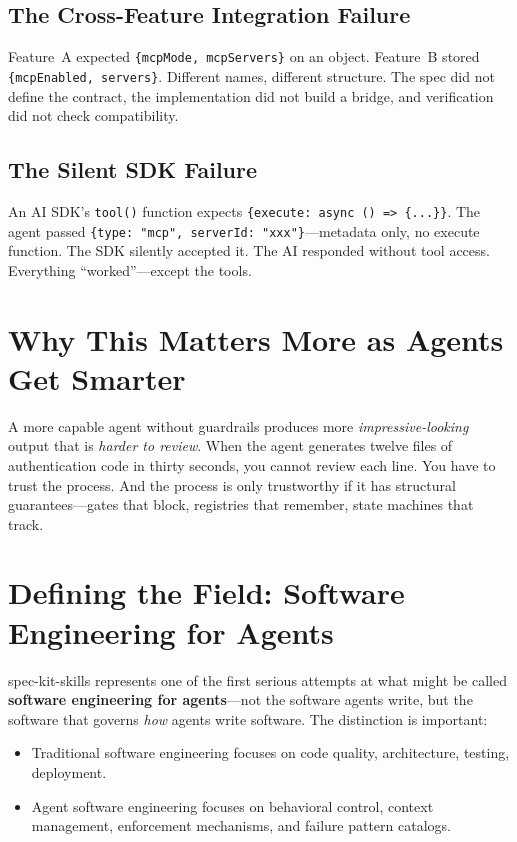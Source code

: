\documentclass[11pt,a4paper,openright,twoside]{report}
\begin{document}
\subsection{The Cross-Feature Integration Failure}

Feature~A expected \texttt{\{mcpMode, mcpServers\}} on an object. Feature~B stored \texttt{\{mcpEnabled, servers\}}. Different names, different structure. The spec did not define the contract, the implementation did not build a bridge, and verification did not check compatibility.

\subsection{The Silent SDK Failure}

An AI SDK's \texttt{tool()} function expects \texttt{\{execute: async () => \{...\}\}}. The agent passed \texttt{\{type: "mcp", serverId: "xxx"\}}---metadata only, no execute function. The SDK silently accepted it. The AI responded without tool access. Everything ``worked''---except the tools.

\section{Why This Matters More as Agents Get Smarter}

A more capable agent without guardrails produces more \emph{impressive-looking} output that is \emph{harder to review}. When the agent generates twelve files of authentication code in thirty seconds, you cannot review each line. You have to trust the process. And the process is only trustworthy if it has structural guarantees---gates that block, registries that remember, state machines that track.

\section{Defining the Field: Software Engineering for Agents}

spec-kit-skills represents one of the first serious attempts at what might be called \textbf{software engineering for agents}---not the software agents write, but the software that governs \emph{how} agents write software. The distinction is important:

\begin{itemize}
  \item Traditional software engineering focuses on code quality, architecture, testing, deployment.
  \item Agent software engineering focuses on behavioral control, context management, enforcement mechanisms, and failure pattern catalogs.
\end{itemize}
\end{document}
